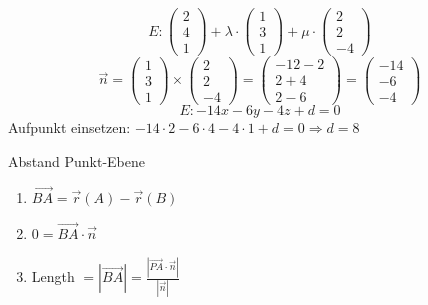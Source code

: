 \begin{example}
    $$E: \begin{pmatrix} 2 \\ 4 \\ 1 \end{pmatrix} + \lambda \cdot \begin{pmatrix} 1 \\ 3 \\ 1 \end{pmatrix} + \mu \cdot \begin{pmatrix} 2 \\ 2 \\ -4 \end{pmatrix}$$
    $$\vec{n} = \begin{pmatrix} 1 \\ 3 \\ 1 \end{pmatrix} \times \begin{pmatrix} 2 \\ 2 \\ -4 \end{pmatrix} = \begin{pmatrix} -12 -2 \\ 2 + 4 \\ 2 - 6 \end{pmatrix} = \begin{pmatrix} -14 \\ -6 \\ -4 \end{pmatrix}$$
    $$E: -14x - 6y - 4z + d = 0$$
    Aufpunkt einsetzen: $-14 \cdot 2 - 6 \cdot 4 - 4 \cdot 1 + d = 0 \Rightarrow d = 8$
\end{example}

\begin{KR}{Abstand Punkt-Ebene}
    \begin{enumerate}
        \item $\overrightarrow{BA} = \overrightarrow{r}(A) - \overrightarrow{r}(B)$
        \item $0 = \overrightarrow{BA} \cdot \overrightarrow{n}$
        \item Length $= |\overrightarrow{BA}| = \frac{|\overrightarrow{PA} \cdot \overrightarrow{n}|}{|\overrightarrow{n}|}$
    \end{enumerate}
\end{KR}









